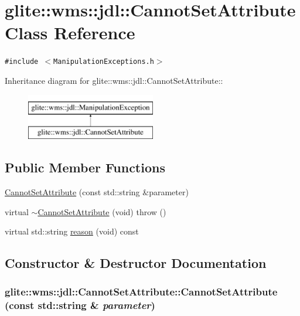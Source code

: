 \hypertarget{classglite_1_1wms_1_1jdl_1_1CannotSetAttribute}{
\section{glite::wms::jdl::Cannot\-Set\-Attribute Class Reference}
\label{classglite_1_1wms_1_1jdl_1_1CannotSetAttribute}
}
{\tt \#include $<$Manipulation\-Exceptions.h$>$}

Inheritance diagram for glite::wms::jdl::Cannot\-Set\-Attribute::\begin{figure}[H]
\begin{center}
\leavevmode
\includegraphics[height=2cm]{classglite_1_1wms_1_1jdl_1_1CannotSetAttribute}
\end{center}
\end{figure}
\subsection*{Public Member Functions}
\begin{CompactItemize}
\item 
\hyperlink{classglite_1_1wms_1_1jdl_1_1CannotSetAttribute_a0}{Cannot\-Set\-Attribute} (const std::string \&parameter)
\item 
virtual \hyperlink{classglite_1_1wms_1_1jdl_1_1CannotSetAttribute_a1}{$\sim$Cannot\-Set\-Attribute} (void)  throw ()
\item 
virtual std::string \hyperlink{classglite_1_1wms_1_1jdl_1_1CannotSetAttribute_a2}{reason} (void) const 
\end{CompactItemize}


\subsection{Constructor \& Destructor Documentation}
\hypertarget{classglite_1_1wms_1_1jdl_1_1CannotSetAttribute_a0}{
\subsubsection[CannotSetAttribute]{\setlength{\rightskip}{0pt plus 5cm}glite::wms::jdl::Cannot\-Set\-Attribute::Cannot\-Set\-Attribute (const std::string \& {\em parameter})}}
\label{classglite_1_1wms_1_1jdl_1_1CannotSetAttribute_a0}


